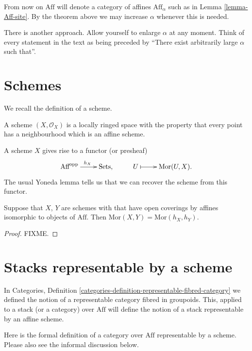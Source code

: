 \noindent
From now on $\text{Aff}$ will denote a category of affines $\text{Aff}_\alpha$
such as in Lemma \ref{lemma-Aff-site}. By the theorem above we may increase
$\alpha$ whenever this is needed.

\begin{remark}
\label{remark-other-approach}
There is another approach. Allow yourself to enlarge $\alpha$ at any moment.
Think of every statement in the text as being preceded by ``There exist
arbitrarily large $\alpha$ such that''. 
\end{remark}

\section{Schemes}
\label{section-schemes}

\noindent
We recall the definition of a scheme.

\smallskip\noindent
A scheme $(X,\mathcal{O}_X)$ is a locally ringed space
with the property that every point has a neighbourhood which is an
affine scheme.

\smallskip\noindent
A scheme $X$ gives rise to a functor (or presheaf)
$$
\xymatrix{
\text{Aff}^{\text{opp}} \ar[r]^{h_X} & \text{Sets}, &
U \ar@{|->}[r] & \text{Mor}(U, X).}
$$
The usual Yoneda lemma tells us that we can recover the scheme from this
functor. 

\begin{lemma}
\label{lemma-yoneda-schemes}
Suppose that $X$, $Y$ are schemes with that have open coverings
by affines isomorphic to objects of $\text{Aff}$. Then $\text{Mor}(X,Y)
= \text{Mor}(h_X, h_Y)$.
\end{lemma}

\begin{proof}
FIXME.
\end{proof}

\section{Stacks representable by a scheme}
\label{section-stack-representable-by-scheme}

\noindent
In Categories, Definition
\ref{categories-definition-representable-fibred-category} we
defined the notion of a representable category fibred in groupoids. This,
applied to a stack (or a category) over $\text{Aff}$ will define the notion of
a stack representable by an affine scheme. 

\smallskip\noindent
Here is the formal definition of a category over $\text{Aff}$ representable by
a scheme. Please also see the informal discussion below.

